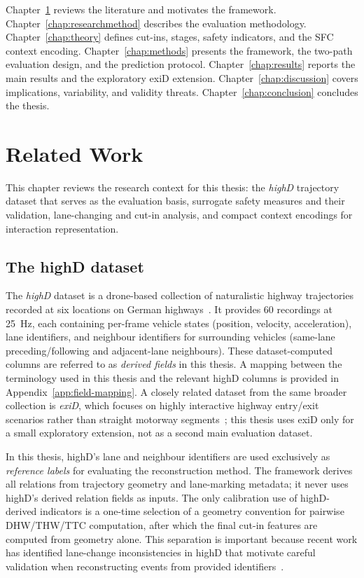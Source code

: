 \documentclass[12pt,a4paper,twoside,openright]{report}
\begin{document}
    Chapter~\ref{chap:relatedwork} reviews the literature and motivates the framework. Chapter~\ref{chap:researchmethod} describes the evaluation methodology. Chapter~\ref{chap:theory} defines cut-ins, stages, safety indicators, and the SFC context encoding. Chapter~\ref{chap:methods} presents the framework, the two-path evaluation design, and the prediction protocol. Chapter~\ref{chap:results} reports the main results and the exploratory exiD extension. Chapter~\ref{chap:discussion} covers implications, variability, and validity threats. Chapter~\ref{chap:conclusion} concludes the thesis.

    \chapter{Related Work}
    \label{chap:relatedwork}

    This chapter reviews the research context for this thesis: the \textit{highD} trajectory dataset that serves as the evaluation basis, surrogate safety measures and their validation, lane-changing and cut-in analysis, and compact context encodings for interaction representation.

    \section{The highD dataset}
    \label{sec:highd}
    The \textit{highD} dataset is a drone-based collection of naturalistic highway trajectories recorded at six locations on German highways~\cite{highd_2018}. It provides 60 recordings at \SI{25}{\hertz}, each containing per-frame vehicle states (position, velocity, acceleration), lane identifiers, and neighbour identifiers for surrounding vehicles (same-lane preceding/following and adjacent-lane neighbours). These dataset-computed columns are referred to as \emph{derived fields} in this thesis. A mapping between the terminology used in this thesis and the relevant highD columns is provided in Appendix~\ref{app:field-mapping}. A closely related dataset from the same broader collection is \textit{exiD}, which focuses on highly interactive highway entry/exit scenarios rather than straight motorway segments~\cite{moers2022exid}; this thesis uses exiD only for a small exploratory extension, not as a second main evaluation dataset.

    In this thesis, highD's lane and neighbour identifiers are used exclusively as \emph{reference labels} for evaluating the reconstruction method. The framework derives all relations from trajectory geometry and lane-marking metadata; it never uses highD's derived relation fields as inputs. The only calibration use of highD-derived indicators is a one-time selection of a geometry convention for pairwise DHW/THW/TTC computation, after which the final cut-in features are computed from geometry alone. This separation is important because recent work has identified lane-change inconsistencies in highD that motivate careful validation when reconstructing events from provided identifiers~\cite{wanggao2025highd}.
\end{document}
